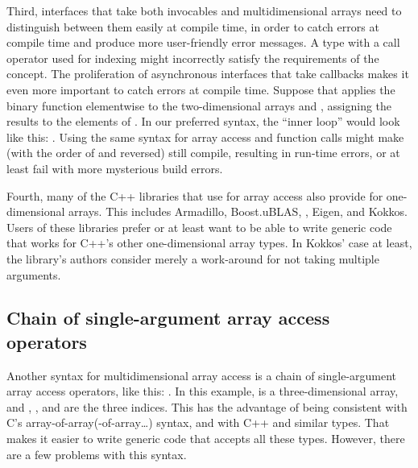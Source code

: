 \documentclass{wg21}
\begin{document}
Third, interfaces that take both invocables and multidimensional arrays need to distinguish between them easily at compile time, in order to catch errors at compile time and produce more user-friendly error messages.  A type with a call operator used for indexing might incorrectly satisfy the requirements of the  concept.  The proliferation of asynchronous interfaces that take callbacks makes it even more important to catch errors at compile time.  Suppose that  applies the binary function  elementwise to the two-dimensional arrays  and , assigning the results to the elements of .  In our preferred syntax, the ``inner loop'' would look like this: .  Using the same syntax for array access and function calls might make  (with the order of  and  reversed) still compile, resulting in run-time errors, or at least fail with more mysterious build errors.

Fourth, many of the C++ libraries that use  for array access also provide  for one-dimensional arrays.  This includes Armadillo, Boost.uBLAS, , Eigen, and Kokkos.  Users of these libraries prefer  or at least want to be able to write generic code that works for C++'s other one-dimensional array types.  In Kokkos' case at least, the library's authors consider  merely a work-around for  not taking multiple arguments.

\subsection{Chain of single-argument array access operators}

Another syntax for multidimensional array access is a chain of single-argument array access operators, like this: .  In this example,  is a three-dimensional array, and , , and  are the three indices.  This has the advantage of being consistent with C's array-of-array(-of-array\ldots) syntax, and with C++  and similar types.  That makes it easier to write generic code that accepts all these types.  However, there are a few problems with this syntax.
\end{document}
